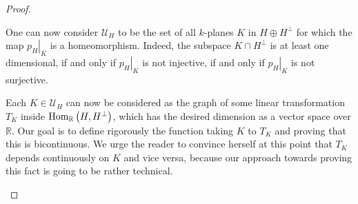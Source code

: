 \begin{proof}
\begin{b_item}
One can now consider $\mathcal{U}_H$ to be the set of all $k$-planes $K$ in $H\oplus H^{\perp}$ for which the map $\left.p_H\right|_{K}$ is a homeomorphism. Indeed, the subspace $K\cap H^{\perp}$ is at least one dimensional, if and only if $\left.p_H\right|_K$ is not injective, if and only if $\left.p_H\right|_K$ is not surjective.

Each $K\in\mathcal{U}_H$ can now be considered as the graph of some linear transformation $T_K$ inside $\mathrm{Hom}_{\mathbb{R}}\left(H,H^{\perp}\right)$, which has the desired dimension as a vector space over $\mathbb{R}$. Our goal is to define rigorously the function taking $K$ to $T_K$ and proving that this is bicontinuous. We urge the reader to convince herself at this point that $T_K$ depends continuously on $K$ and vice versa, because our approach towards proving this fact is going to be rather technical.


\end{b_item}
\end{proof}
